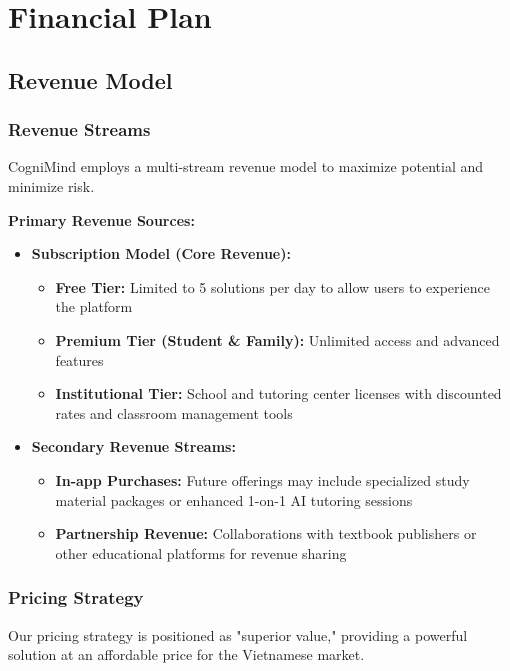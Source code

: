 \section{Financial Plan}

\subsection{Revenue Model}
\subsubsection{Revenue Streams}
CogniMind employs a multi-stream revenue model to maximize potential and minimize risk.

\textbf{Primary Revenue Sources:}
\begin{itemize}
    \item \textbf{Subscription Model (Core Revenue):}
    \begin{itemize}
        \item \textbf{Free Tier:} Limited to 5 solutions per day to allow users to experience the platform
        \item \textbf{Premium Tier (Student \& Family):} Unlimited access and advanced features
        \item \textbf{Institutional Tier:} School and tutoring center licenses with discounted rates and classroom management tools
    \end{itemize}
    \item \textbf{Secondary Revenue Streams:}
    \begin{itemize}
        \item \textbf{In-app Purchases:} Future offerings may include specialized study material packages or enhanced 1-on-1 AI tutoring sessions
        \item \textbf{Partnership Revenue:} Collaborations with textbook publishers or other educational platforms for revenue sharing
    \end{itemize}
\end{itemize}

\subsubsection{Pricing Strategy}
Our pricing strategy is positioned as "superior value," providing a powerful solution at an affordable price for the Vietnamese market.

